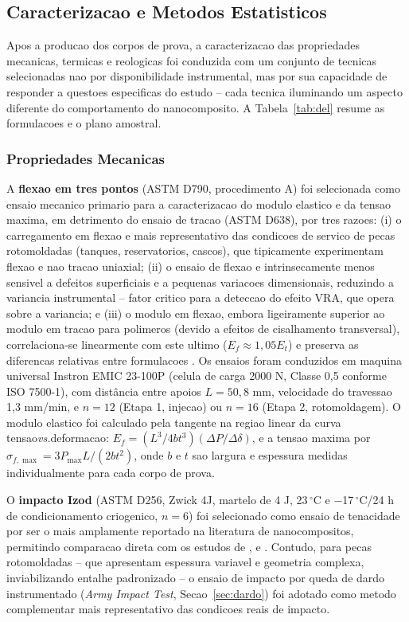 \documentclass[11pt,a4paper,oneside]{article}
\begin{document}
\subsection{Caracterizacao e Metodos Estatisticos}\label{sec:caract_estat}

Apos a producao dos corpos de prova, a caracterizacao das propriedades mecanicas, termicas e
reologicas foi conduzida com um conjunto de tecnicas selecionadas nao por disponibilidade
instrumental, mas por sua capacidade de responder a questoes especificas do estudo -- cada
tecnica iluminando um aspecto diferente do comportamento do nanocomposito. A Tabela~\ref{tab:del}
resume as formulacoes e o plano amostral.

\subsubsection{Propriedades Mecanicas}

A {\bfseries flexao em tres pontos} (ASTM D790, procedimento A) foi selecionada como ensaio
mecanico primario para a caracterizacao do modulo elastico e da tensao maxima, em detrimento do
ensaio de tracao (ASTM D638), por tres razoes: (i) o carregamento em flexao e mais representativo
das condicoes de servico de pecas rotomoldadas (tanques, reservatorios, cascos), que tipicamente
experimentam flexao e nao tracao uniaxial; (ii) o ensaio de flexao e intrinsecamente menos
sensivel a defeitos superficiais e a pequenas variacoes dimensionais, reduzindo a variancia
instrumental -- fator critico para a deteccao do efeito VRA, que opera sobre a variancia; e
(iii) o modulo em flexao, embora ligeiramente superior ao modulo em tracao para polimeros
(devido a efeitos de cisalhamento transversal), correlaciona-se linearmente com este ultimo
($E_f{\approx}1{,}05E_t$) e preserva as diferencas relativas entre formulacoes \cite{Montgomery2020}.
Os ensaios foram conduzidos em maquina universal Instron EMIC 23-100P (celula de carga 2000 N,
Classe 0,5 conforme ISO 7500-1), com distância entre apoios $L{=}50{,}8$ mm, velocidade do
travessao 1,3 mm/min, e $n{=}12$ (Etapa 1, injecao) ou $n{=}16$ (Etapa 2, rotomoldagem). O
modulo elastico foi calculado pela tangente na regiao linear da curva tensao\textit{vs.}deformacao:
$E_f{=}(L^3/4bt^3)(\Delta P/\Delta\delta)$, e a tensao maxima por $\sigma_{f,\max}{=}3P_{\max}L/(2bt^2)$,
onde $b$ e $t$ sao largura e espessura medidas individualmente para cada corpo de prova.

O {\bfseries impacto Izod} (ASTM D256, Zwick 4J, martelo de 4 J, 23$\,^{\circ}$C e
$-$17$\,^{\circ}$C/24 h de condicionamento criogenico, $n{=}6$) foi selecionado como ensaio de
tenacidade por ser o mais amplamente reportado na literatura de nanocompositos, permitindo
comparacao direta com os estudos de \citet{Kim2010}, \citet{Potts2011} e \citet{Araby2020}.
Contudo, para pecas rotomoldadas -- que apresentam espessura variavel e geometria complexa,
inviabilizando entalhe padronizado -- o ensaio de impacto por queda de dardo instrumentado
(\textit{Army Impact Test}, Secao~\ref{sec:dardo}) foi adotado como metodo complementar mais
representativo das condicoes reais de impacto.
\end{document}

